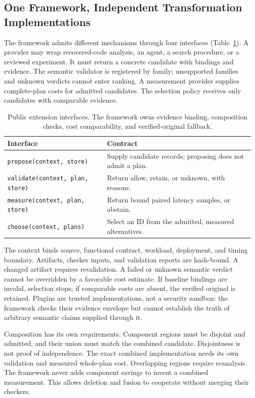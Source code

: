 \documentclass[acmsmall,screen,review,anonymous]{acmart}
\begin{document}
\subsection{One Framework, Independent Transformation Implementations}
\label{sec:framework}
The framework admits different mechanisms through four interfaces
(Table~\ref{tab:api}). A provider may wrap recovered-code analysis, an agent,
a search procedure, or a reviewed experiment. It must return a concrete
candidate with bindings and evidence. The semantic validator is registered
by family; unsupported families and unknown verdicts cannot enter ranking.
A measurement provider supplies complete-plan costs for admitted candidates.
The selection policy receives only candidates with comparable evidence.

\begin{table}[t]
\caption{Public extension interfaces. The framework owns evidence binding,
composition checks, cost comparability, and verified-original fallback.}
\label{tab:api}
\small
\begin{tabularx}{\linewidth}{@{}lX@{}}
\toprule
Interface & Contract \\
\midrule
\texttt{propose(context, store)} & Supply candidate records; proposing does not admit a plan. \\
\texttt{validate(context, plan, store)} & Return allow, retain, or unknown, with reasons. \\
\texttt{measure(context, plan, store)} & Return bound paired latency samples, or abstain. \\
\texttt{choose(context, plans)} & Select an ID from the admitted, measured alternatives. \\
\bottomrule
\end{tabularx}
\end{table}

The context binds source, functional contract, workload, deployment, and timing
boundary. Artifacts, checker inputs, and validation reports are hash-bound.
A changed artifact requires revalidation. A failed or unknown semantic verdict
cannot be overridden by a favorable cost estimate. If baseline bindings are
invalid, selection stops; if comparable costs are absent, the verified original
is retained. Plugins are trusted implementations, not a security sandbox:
the framework checks their evidence envelope but cannot establish the truth
of arbitrary semantic claims supplied through it.

Composition has its own requirements. Component regions must be disjoint and
admitted, and their union must match the combined candidate. Disjointness is
not proof of independence. The exact combined implementation needs its own
validation and measured whole-plan cost. Overlapping regions require reanalysis.
The framework never adds component savings to invent a combined measurement.
This allows deletion and fusion to cooperate without merging their checkers.
\end{document}
